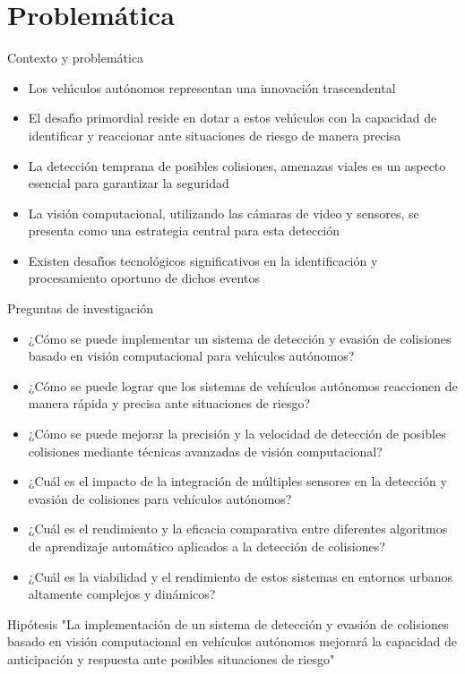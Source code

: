 \documentclass[8pt]{beamer}
\begin{document}
    \section{Problemática}
    \begin{frame}{Contexto y problemática}
        \begin{itemize}
            \item Los vehı́culos autónomos representan una innovación trascendental
            \item El desafı́o primordial reside en dotar a estos vehı́culos con la capacidad de identificar y reaccionar ante situaciones de riesgo de manera precisa
            \item La detección temprana de posibles colisiones, amenazas viales es un aspecto esencial para garantizar la seguridad
            \item La visión computacional, utilizando las cámaras de video y sensores, se presenta como una estrategia central para esta detección
            \item Existen desafı́os tecnológicos significativos en la identificación y procesamiento oportuno de dichos eventos
        \end{itemize}
    \end{frame}
    \begin{frame}{Preguntas de investigación}
        \begin{itemize}
            \item ¿Cómo se puede implementar un sistema de detección y evasión de colisiones basado en visión computacional para vehı́culos autónomos?
            \item ¿Cómo se puede lograr que los sistemas de vehículos autónomos reaccionen de manera rápida y precisa ante situaciones de riesgo?
            \item ¿Cómo se puede mejorar la precisión y la velocidad de detección de posibles colisiones mediante técnicas avanzadas de visión computacional?
            \item ¿Cuál es el impacto de la integración de múltiples sensores en la detección y evasión de colisiones para vehículos autónomos?
            \item ¿Cuál es el rendimiento y la eficacia comparativa entre diferentes algoritmos de aprendizaje automático aplicados a la detección de colisiones?
            \item ¿Cuál es la viabilidad y el rendimiento de estos sistemas en entornos urbanos altamente complejos y dinámicos?
        \end{itemize}
    \end{frame}
    \begin{frame}{Hipótesis}
        "La implementación de un sistema de detección y evasión de colisiones basado en visión computacional en vehículos autónomos
        mejorará la capacidad de anticipación y respuesta ante posibles situaciones de riesgo"
    \end{frame}
\end{document}
